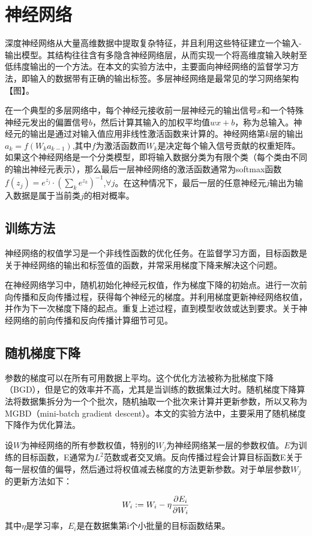 \documentclass[zihao = -4,cn]{oucart}
\begin{document}
\section{神经网络}
深度神经网络从大量高维数据中提取复杂特征，并且利用这些特征建立一个输入-输出模型。其结构往往含有多隐含神经网络层，从而实现一个将高维度输入映射至低纬度输出的一个方法。在本文的实验方法中，主要面向神经网络的监督学习方法，即输入的数据带有正确的输出标签。多层神经网络是最常见的学习网络架构【图】。\par
在一个典型的多层网络中，每个神经元接收前一层神经元的输出信号$x$和一个特殊神经元发出的偏置信号$b$，然后计算其输入的加权平均值$wx+b$，称为总输入。神经元的输出是通过对输入值应用非线性激活函数来计算的。神经网络第$k$层的输出$a_k = f(W_ka_{k-1})$,其中$f$为激活函数而$W_k$是决定每个输入信号贡献的权重矩阵。如果这个神经网络是一个分类模型，即将输入数据分类为有限个类（每个类由不同的输出神经元表示），那么最后一层神经网络的激活函数通常为softmax函数$f(z_j)=e^{z_j}\cdot(\sum_k{e^{z_k}})^{-1}$,$\forall{j}$。在这种情况下，最后一层的任意神经元$j$输出为输入数据是属于当前类$j$的相对概率。\par

\subsection{训练方法}
神经网络的权值学习是一个非线性函数的优化任务。在监督学习方面，目标函数是关于神经网络的输出和标签值的函数，并常采用梯度下降来解决这个问题。\par
在神经网络学习中，随机初始化神经元权值，作为梯度下降的初始点。进行一次前向传播和反向传播过程，获得每个神经元的梯度。并利用梯度更新神经网络权值，并作为下一次梯度下降的起点。重复上述过程，直到模型收敛或达到要求。关于神经网络的前向传播和反向传播计算细节可见\cite{周志华2016机器学习}。 \par

\subsection{随机梯度下降}
参数的梯度可以在所有可用数据上平均。这个优化方法被称为批梯度下降（BGD），但是它的效率并不高，尤其是当训练的数据集过大时。随机梯度下降算法将数据集拆分为一个个批次，随机抽取一个批次来计算并更新参数，所以又称为MGBD（mini-batch gradient descent）。本文的实验方法中，主要采用了随机梯度下降作为优化算法。\par
设$W$为神经网络的所有参数权值，特别的$W_j$为神经网络某一层的参数权值。$E$为训练的目标函数，E通常为$L^2$范数或者交叉熵\cite{murphy2012machine}。反向传播过程会计算目标函数E关于每一层权值的偏导，然后通过将权值减去梯度的方法更新参数。对于单层参数$W_j$的更新方法如下：\par
\begin{equation}
W_i := W_i - \eta \frac{\partial E_i}{\partial W_i}\\
\end{equation}
其中$\eta$是学习率，$E_i$是在数据集第i个小批量的目标函数结果。
\end{document}
